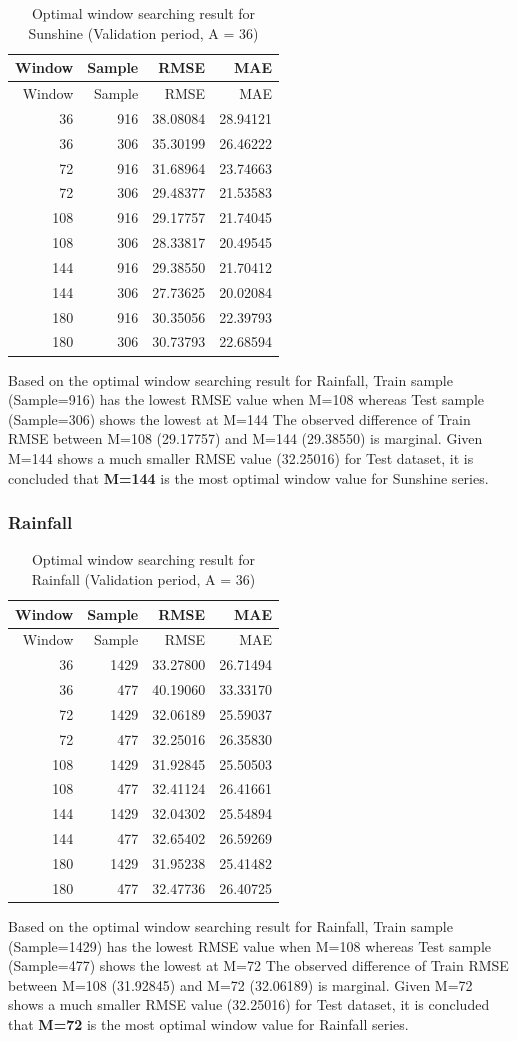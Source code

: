 \documentclass[
  11pt,
]{article}
\begin{document}
\begin{longtable}[]{@{}rrrr@{}}
\caption{Optimal window searching result for Sunshine (Validation
period, A = 36)}\tabularnewline
\toprule
Window & Sample & RMSE & MAE\tabularnewline
\midrule
\endfirsthead
\toprule
Window & Sample & RMSE & MAE\tabularnewline
\midrule
\endhead
36 & 916 & 38.08084 & 28.94121\tabularnewline
36 & 306 & 35.30199 & 26.46222\tabularnewline
72 & 916 & 31.68964 & 23.74663\tabularnewline
72 & 306 & 29.48377 & 21.53583\tabularnewline
108 & 916 & 29.17757 & 21.74045\tabularnewline
108 & 306 & 28.33817 & 20.49545\tabularnewline
144 & 916 & 29.38550 & 21.70412\tabularnewline
144 & 306 & 27.73625 & 20.02084\tabularnewline
180 & 916 & 30.35056 & 22.39793\tabularnewline
180 & 306 & 30.73793 & 22.68594\tabularnewline
\bottomrule
\end{longtable}

Based on the optimal window searching result for Rainfall, Train sample
(Sample=916) has the lowest RMSE value when M=108 whereas Test sample
(Sample=306) shows the lowest at M=144 The observed difference of Train
RMSE between M=108 (29.17757) and M=144 (29.38550) is marginal. Given
M=144 shows a much smaller RMSE value (32.25016) for Test dataset, it is
concluded that \textbf{M=144} is the most optimal window value for
Sunshine series.

\hypertarget{rainfall}{%
\subsubsection{Rainfall}\label{rainfall}}

\begin{longtable}[]{@{}rrrr@{}}
\caption{Optimal window searching result for Rainfall (Validation
period, A = 36)}\tabularnewline
\toprule
Window & Sample & RMSE & MAE\tabularnewline
\midrule
\endfirsthead
\toprule
Window & Sample & RMSE & MAE\tabularnewline
\midrule
\endhead
36 & 1429 & 33.27800 & 26.71494\tabularnewline
36 & 477 & 40.19060 & 33.33170\tabularnewline
72 & 1429 & 32.06189 & 25.59037\tabularnewline
72 & 477 & 32.25016 & 26.35830\tabularnewline
108 & 1429 & 31.92845 & 25.50503\tabularnewline
108 & 477 & 32.41124 & 26.41661\tabularnewline
144 & 1429 & 32.04302 & 25.54894\tabularnewline
144 & 477 & 32.65402 & 26.59269\tabularnewline
180 & 1429 & 31.95238 & 25.41482\tabularnewline
180 & 477 & 32.47736 & 26.40725\tabularnewline
\bottomrule
\end{longtable}

Based on the optimal window searching result for Rainfall, Train sample
(Sample=1429) has the lowest RMSE value when M=108 whereas Test sample
(Sample=477) shows the lowest at M=72 The observed difference of Train
RMSE between M=108 (31.92845) and M=72 (32.06189) is marginal. Given
M=72 shows a much smaller RMSE value (32.25016) for Test dataset, it is
concluded that \textbf{M=72} is the most optimal window value for
Rainfall series.
\end{document}
